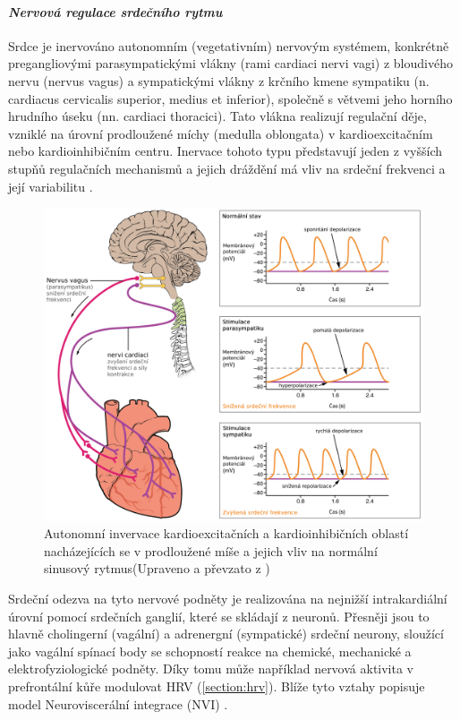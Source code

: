 \paragraph*{\textit{Nervová regulace srdečního rytmu}\\} Srdce je inervováno
autonomním (vegetativním) nervovým systémem, konkrétně pregangliovými
parasympatickými vlákny (rami cardiaci nervi vagi) z bloudivého nervu (nervus
vagus) a sympatickými vlákny z krčního kmene sympatiku (n. cardiacus cervicalis
superior, medius et inferior), společně s větvemi jeho horního hrudního úseku
(nn. cardiaci thoracici). Tato vlákna realizují regulační děje, vzniklé na
úrovní prodloužené míchy (medulla oblongata) v kardioexcitačním nebo
kardioinhibičním centru. Inervace tohoto typu představují jeden z vyšších stupňů
regulačních mechanismů a jejich dráždění má vliv na srdeční frekvenci a její
variabilitu \cite{Dylevsky2013,Petrek2019,Kittnar2020}.

\begin{figure}[h]
	\begin{center}
		\includegraphics[width=1\textwidth]{../assets/anatomy/hr_regulation}
		\caption{Autonomní invervace kardioexcitačních a kardioinhibičních
			oblastí nacházejících se v prodloužené míše a jejich vliv na
			normální sinusový rytmus(Upraveno a převzato z \cite{OpenStax})}
		\label{img:hr_regulation}
	\end{center}
\end{figure}

Srdeční odezva na tyto nervové podněty je realizována na nejnižší intrakardiální
úrovní pomocí srdečních ganglií, které se skládají z neuronů. Přesněji jsou to
hlavně cholingerní (vagální) a adrenergní (sympatické) srdeční neurony, sloužící
jako vagální spínací body se schopností reakce na chemické, mechanické a
elektrofyziologické podněty. Díky tomu může například nervová aktivita v
prefrontální kůře modulovat HRV (\ref{section:hrv}). Blíže tyto vztahy popisuje
model Neuroviscerální integrace (NVI) \cite{Smith2017}.

